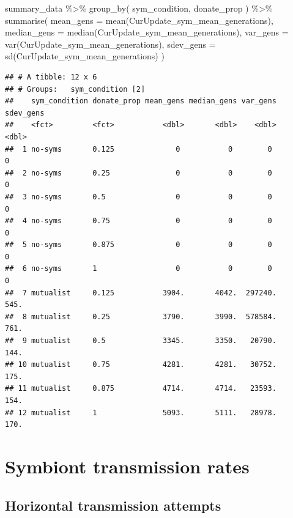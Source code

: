 \documentclass[
]{book}
\newenvironment{Shaded}{\begin{snugshade}}{\end{snugshade}}
\newcommand{\AttributeTok}[1]{\textcolor[rgb]{0.77,0.63,0.00}{#1}}
\newcommand{\FunctionTok}[1]{\textcolor[rgb]{0.00,0.00,0.00}{#1}}
\newcommand{\NormalTok}[1]{#1}
\newcommand{\SpecialCharTok}[1]{\textcolor[rgb]{0.00,0.00,0.00}{#1}}
\begin{document}
\begin{Shaded}
\begin{Highlighting}[]
\NormalTok{summary\_data }\SpecialCharTok{\%\textgreater{}\%}
  \FunctionTok{group\_by}\NormalTok{(}
\NormalTok{    sym\_condition,}
\NormalTok{    donate\_prop}
\NormalTok{  ) }\SpecialCharTok{\%\textgreater{}\%}
  \FunctionTok{summarise}\NormalTok{(}
    \AttributeTok{mean\_gens =} \FunctionTok{mean}\NormalTok{(CurUpdate\_sym\_mean\_generations),}
    \AttributeTok{median\_gens =} \FunctionTok{median}\NormalTok{(CurUpdate\_sym\_mean\_generations),}
    \AttributeTok{var\_gens =} \FunctionTok{var}\NormalTok{(CurUpdate\_sym\_mean\_generations),}
    \AttributeTok{sdev\_gens =} \FunctionTok{sd}\NormalTok{(CurUpdate\_sym\_mean\_generations)}
\NormalTok{  )}
\end{Highlighting}
\end{Shaded}

\begin{verbatim}
## # A tibble: 12 x 6
## # Groups:   sym_condition [2]
##    sym_condition donate_prop mean_gens median_gens var_gens sdev_gens
##    <fct>         <fct>           <dbl>       <dbl>    <dbl>     <dbl>
##  1 no-syms       0.125              0           0        0         0 
##  2 no-syms       0.25               0           0        0         0 
##  3 no-syms       0.5                0           0        0         0 
##  4 no-syms       0.75               0           0        0         0 
##  5 no-syms       0.875              0           0        0         0 
##  6 no-syms       1                  0           0        0         0 
##  7 mutualist     0.125           3904.       4042.  297240.      545.
##  8 mutualist     0.25            3790.       3990.  578584.      761.
##  9 mutualist     0.5             3345.       3350.   20790.      144.
## 10 mutualist     0.75            4281.       4281.   30752.      175.
## 11 mutualist     0.875           4714.       4714.   23593.      154.
## 12 mutualist     1               5093.       5111.   28978.      170.
\end{verbatim}

\hypertarget{symbiont-transmission-rates-3}{%
\section{Symbiont transmission rates}\label{symbiont-transmission-rates-3}}

\hypertarget{horizontal-transmission-attempts-3}{%
\subsection{Horizontal transmission attempts}\label{horizontal-transmission-attempts-3}}
\end{document}
